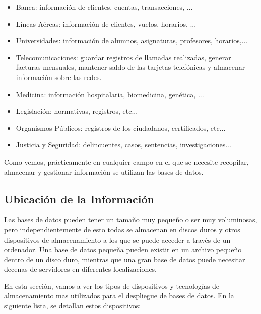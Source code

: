 \begin{itemize}
    \item Banca: información de clientes, cuentas, transacciones, ...
    \item Líneas Aéreas: información de clientes, vuelos, horarios, ...
    \item Universidades: información de alumnos, asignaturas, profesores, horarios,...
    \item Telecomunicaciones: guardar registros de llamadas realizadas, generar facturas mensuales, mantener saldo de las tarjetas telefónicas y almacenar información sobre las redes.
    \item Medicina: información hospitalaria, biomedicina, genética, ...
    \item Legislación: normativas, registros, etc...
    \item Organismos Públicos: registros de los ciudadanos, certificados, etc...
    \item Justicia y Seguridad: delincuentes, casos, sentencias, investigaciones...
\end{itemize}

Como vemos, prácticamente en cualquier campo en el que se necesite recopilar, almacenar y gestionar información se utilizan las bases de datos.

\subsection{Ubicación de la Información}
Las bases de datos pueden tener un tamaño muy pequeño o ser muy voluminosas, pero independientemente de esto todas se almacenan en discos duros y otros dispositivos de almacenamiento a los que se puede acceder a través de un ordenador. Una base de datos pequeña pueden existir en un archivo pequeño dentro de un disco duro, mientras que una gran base de datos puede necesitar decenas de servidores en diferentes localizaciones.

En esta sección, vamos a ver los tipos de dispositivos y tecnologías de almacenamiento mas utilizados para el despliegue de bases de datos. En la siguiente lista, se detallan estos dispositivos:

